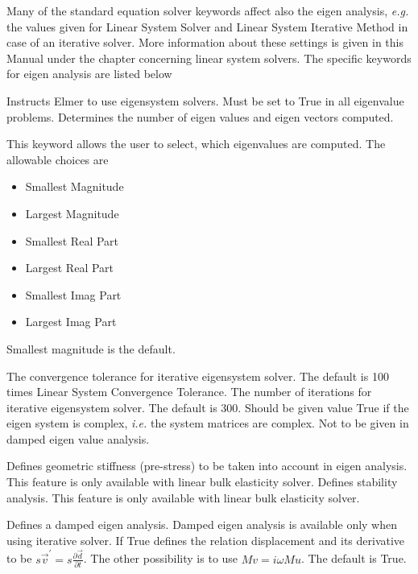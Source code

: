 Many of the standard equation solver keywords affect also the eigen
analysis, {\em e.g.} the values given for Linear System Solver and
Linear System Iterative Method in case of an iterative solver. More
information about these settings is given in this Manual under the
chapter concerning linear system solvers. The specific keywords for
eigen analysis are listed below

\sifbegin 
{} 
Instructs Elmer to use eigensystem solvers. Must be set to True
in all eigenvalue problems.
Determines the number of eigen values and eigen vectors computed.

This keyword allows the user to select, which eigenvalues are
computed. The allowable choices are
\begin{itemize}
\item Smallest Magnitude
\item Largest Magnitude
\item Smallest Real Part
\item Largest Real Part
\item Smallest Imag Part
\item Largest Imag Part
\end{itemize}
Smallest magnitude is the default.
 
The convergence tolerance for iterative eigensystem solver. The
default is 100 times Linear System Convergence Tolerance.
The number of iterations for iterative eigensystem solver. The
default is 300.
Should be given value True if the eigen system is complex, {\em i.e.}
the system matrices are complex. Not to be given in damped eigen value
analysis.

Defines geometric stiffness (pre-stress) to be taken into account in
eigen analysis. This feature is only available with linear bulk
elasticity solver.
Defines stability analysis. This feature is only available with linear
bulk elasticity solver.

Defines a damped eigen analysis. Damped eigen analysis is available
only when using iterative solver.
If True defines the relation displacement and its derivative to be
$s\vec{v}^{\prime} = s\frac{\partial \vec{d}}{\partial t}$. The other
possibility is to use $Mv=i\omega Mu$. The default is True.

